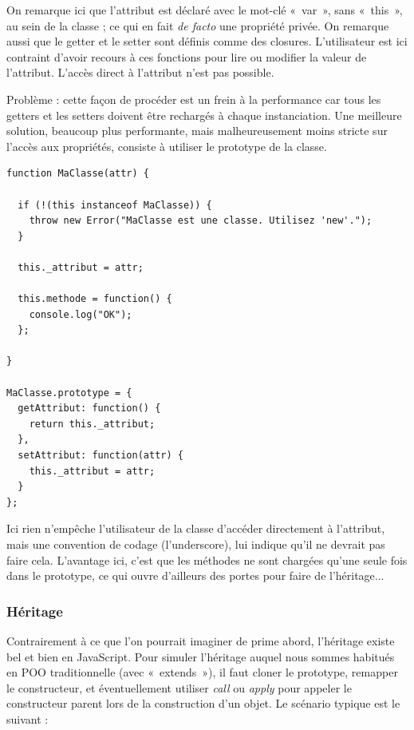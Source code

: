 \documentclass[a4paper,12pt]{article}
\begin{document}
On remarque ici que l'attribut est déclaré avec le mot-clé «~var~», sans «~this~», au sein de la classe ; ce qui en fait \textit{de facto} une propriété privée. On remarque aussi que le getter et le setter sont définis comme des closures. L'utilisateur est ici contraint d'avoir recours à ces fonctions pour lire ou modifier la valeur de l'attribut. L'accès direct à l'attribut n'est pas possible.

Problème : cette façon de procéder est un frein à la performance car tous les getters et les setters doivent être rechargés à chaque instanciation. Une meilleure solution, beaucoup plus performante, mais malheureusement moins stricte sur l'accès aux propriétés, consiste à utiliser le prototype de la classe.

\vspace{7pt}

\begin{lstlisting}
function MaClasse(attr) {

  if (!(this instanceof MaClasse)) {
    throw new Error("MaClasse est une classe. Utilisez 'new'.");
  }

  this._attribut = attr;
  
  this.methode = function() {
    console.log("OK");
  };
  
}

MaClasse.prototype = {
  getAttribut: function() {
    return this._attribut;
  },
  setAttribut: function(attr) {
    this._attribut = attr;
  }
};
\end{lstlisting}

Ici rien n'empêche l'utilisateur de la classe d'accéder directement à l'attribut, mais une convention de codage (l'underscore), lui indique qu'il ne devrait pas faire cela. L'avantage ici, c'est que les méthodes ne sont chargées qu'une seule fois dans le prototype, ce qui ouvre d'ailleurs des portes pour faire de l'héritage...

\subsubsection{Héritage}

Contrairement à ce que l'on pourrait imaginer de prime abord, l'héritage existe bel et bien en JavaScript. Pour simuler l'héritage auquel nous sommes habitués en POO traditionnelle (avec «~extends~»), il faut cloner le prototype, remapper le constructeur, et éventuellement utiliser \textit{call} ou \textit{apply} pour appeler le constructeur parent lors de la construction d'un objet. Le scénario typique est le suivant :
\end{document}

